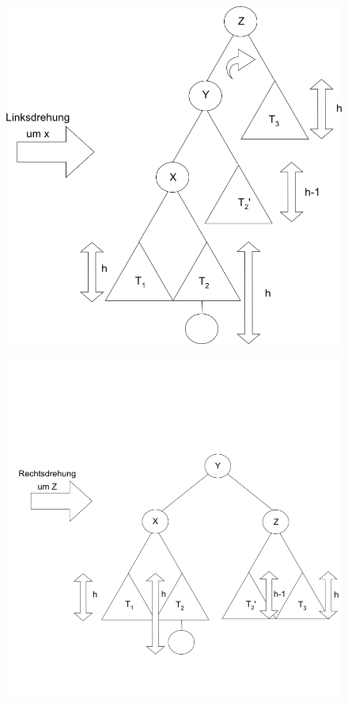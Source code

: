 \begin{minipage}[t]{0.3\textwidth}
\begin{figure}[H]
\includegraphics[width=\textwidth,left]{11/Grafik/img6_doppelRotation_3.png}\\
\end{figure}
\end{minipage}%
%
%
\begin{minipage}[t]{0.3\textwidth}
\begin{figure}[H]
\includegraphics[width=\textwidth,left]{11/Grafik/img7_doppelRotation_4.png}\\
\end{figure}
\end{minipage}%

